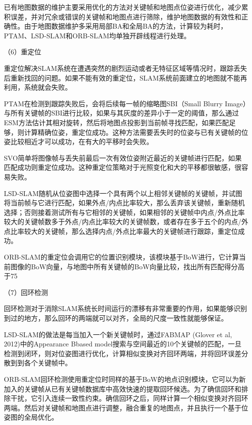 已有地图数据的维护主要采用优化的方法对关键帧和地图点位姿进行优化，减少累积误差，并对冗余或错误的关键帧和地图点进行筛除，维护地图数据的有效性和正确性。由于地图数据维护多采用局部BA和全局BA的方法，计算较为耗时，PTAM、LSD-SLAM和ORB-SLAM均单独开辟线程进行处理。

（6）重定位

重定位解决SLAM系统在遭遇突然的剧烈运动或者无特征区域等情况时，跟踪丢失后重新找回的问题。如果不能有效的重定位，SLAM系统前面建立的地图就不能再利用，系统就会失败。

PTAM在检测到跟踪失败后，会将后续每一帧的缩略图SBI（Small Blurry Image）与所有关键帧的SBI进行比较，如果与其灰度的差异小于一定的阈值，那么通过ESM方法估计其相对旋转，然后将地图点投影到当前帧寻找匹配，如果匹配足够，则计算精确位姿，重定位成功。这种方法需要丢失时的位姿与已有关键帧的位姿比较相近才可以成功，在有大的平移时会失败。

SVO简单将图像帧与丢失前最后一次有效位姿附近最近的关键帧进行匹配，如果匹配成功则重定位成功。这种重定位策略对于光照变化和大的平移都很敏感，很容易失败。

LSD-SLAM随机从位姿图中选择一个具有两个以上相邻关键帧的关键帧，并试图将当前帧与它进行匹配，如果外点/内点比率较大，那么丢弃该关键帧，重新随机选择；否则接着测试所有与它相邻的关键帧，如果相邻的关键帧中内点/外点比率较大的关键帧数多于外点/内点比率较大的关键帧数，或者存在多于五个的内点/外点比率较大的关键帧，那么选择内点/外点比率最大的关键帧进行跟踪，重定位成功。

ORB-SLAM的重定位会调用它的位置识别模块，该模块基于BoW进行，它计算当前图像的BoW向量，与地图中所有关键帧的BoW向量比较，找出所有匹配得分高于75%

（7）回环检测

回环检测对于消除SLAM系统长时间运行的漂移有非常重要的作用，如果能够识别到过的地方，那么回环的两端就可以对齐，全局的尺度一致性就能够保证。

LSD-SLAM的做法是每当加入一个新关键帧时，通过FABMAP (Glover et al, 2012)中的Appearance Bbased model搜索与空间最近的10个关键帧的匹配，一旦检测到闭环，则对位姿图进行优化，计算相似变换对齐回环两端，并将回环误差分散到到各个关键帧中。

ORB-SLAM回环检测使用重定位时同样的基于BoW的地点识别模块，它可以为新加入的关键帧从已有关键帧数据库中高效快速的提取回环候选。为了确信回环和排除干扰，它引入连续一致性约束。确信回环之后，同样计算一个相似变换对齐回环两端。然后对关键帧和地图点进行调整，融合重复的地图点，并且执行一个基于位姿图的全局优化。

